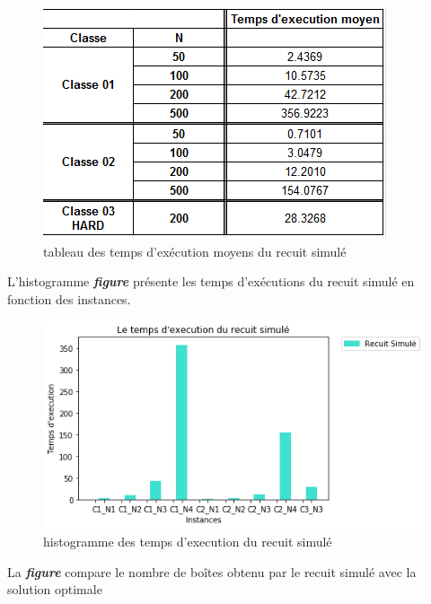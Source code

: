 \documentclass[12pt]{article}
\begin{document}
\begin{figure}[H]
    \centering
    \includegraphics[]{../figures/RS/rs tab temps.PNG}
    \caption{tableau des temps d'exécution moyens du recuit simulé}
    \label{tab:texec}
\end{figure}
L’histogramme \textbf{\emph{figure }} présente les temps d’exécutions  du recuit simulé en fonction des instances.
\begin{figure}[H]
    \centering
    \includegraphics[width=\linewidth]{../figures/RS/texec rs(1).png}
    \caption{histogramme des temps d'execution du recuit simulé}
    \label{fig:texec}
\end{figure}
La  \textbf{\emph{figure }} compare le nombre de boîtes obtenu par le recuit simulé avec la solution optimale
\end{document}
